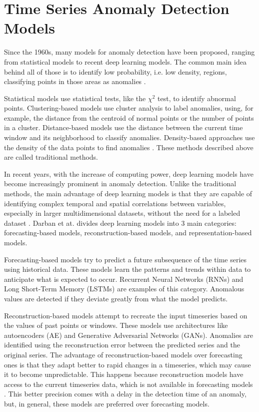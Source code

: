 \section{Time Series Anomaly Detection Models} \label{sec-model-basics}

Since the 1960s, many models for anomaly detection have been proposed, ranging from statistical models to recent deep learning models. The common main idea behind all of those is to identify low probability, i.e. low density, regions, classifying points in those areas as anomalies \cite{Samariya_Thakkar_2021}. 

Statistical models use statistical tests, like the $\chi^2$ test, to identify abnormal points. Clustering-based models use cluster analysis to label anomalies, using, for example, the distance from the centroid of normal points or the number of points in a cluster. Distance-based models use the distance between the current time window and its neighborhood to classify anomalies. Density-based approaches use the density of the data points to find anomalies \cite{Samariya_Thakkar_2021}. These methods described above are called traditional methods.

In recent years, with the increase of computing power, deep learning models have become increasingly prominent in anomaly detection. Unlike the traditional methods, the main advantage of deep learning models is that they are capable of identifying complex temporal and spatial correlations between variables, especially in larger multidimensional datasets, without the need for a labeled dataset \cite{Choi_Yi_Park_Yoon_2021}. Darban et at. \cite{Zamanzadeh_Darban_Webb_Pan_Aggarwal_Salehi_2024} divides deep learning models into 3 main categories: forecasting-based models, reconstruction-based models, and representation-based models.

Forecasting-based models try to predict a future subsequence of the time series using historical data. These models learn the patterns and trends within data to anticipate what is expected to occur. Recurrent Neural Networks (RNNs) and Long Short-Term Memory (LSTMs) are examples of this category. Anomalous values are detected if they deviate greatly from what the model predicts.

Reconstruction-based models attempt to recreate the input timeseries based on the values of past points or windows. These models use architectures like autoencoders (AE) and Generative Adversarial Networks (GANs). Anomalies are identified using the reconstruction error between the predicted series and the original series. The advantage of reconstruction-based models over forecasting ones is that they adapt better to rapid changes in a timeseries, which may cause it to become unpredictable. This happens because reconstruction models have access to the current timeseries data, which is not available in forecasting models \cite{Zamanzadeh_Darban_Webb_Pan_Aggarwal_Salehi_2024}. This better precision comes with a delay in the detection time of an anomaly, but, in general, these models are preferred over forecasting models.

